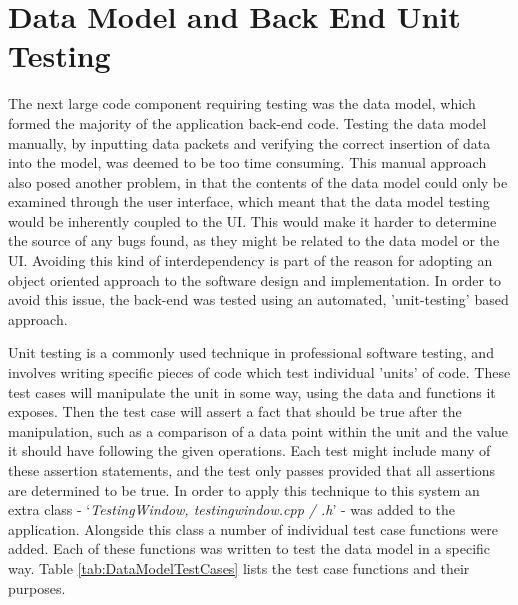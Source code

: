 
\section{Data Model and Back End Unit Testing} \label{BackEndUnitTesting}
The next large code component requiring testing was the data model, which formed the majority of the application back-end code. Testing the data model manually, by inputting data packets and verifying the correct insertion of data into the model, was deemed to be too time consuming. This manual approach also posed another problem, in that the contents of the data model could only be examined through the user interface, which meant that the data model testing would be inherently coupled to the UI. This would make it harder to determine the source of any bugs found, as they might be related to the data model or the UI. Avoiding this kind of interdependency is part of the reason for adopting an object oriented approach to the software design and implementation. In order to avoid this issue, the back-end was tested using an automated, 'unit-testing' based approach.

Unit testing is a commonly used technique in professional software testing, and involves writing specific pieces of code which test individual 'units' of code. These test cases will manipulate the unit in some way, using the data and functions it exposes. Then the test case will assert a fact that should be true after the manipulation, such as a comparison of a data point within the unit and the value it should have following the given operations. Each test might include many of these assertion statements, and the test only passes provided that all assertions are determined to be true. In order to apply this technique to this system an extra class - `\textit{TestingWindow, testingwindow.cpp / .h}' - was added to the application. Alongside this class a number of individual test case functions were added. Each of these functions was written to test the data model in a specific way. Table \ref{tab:DataModelTestCases} lists the test case functions and their purposes.

